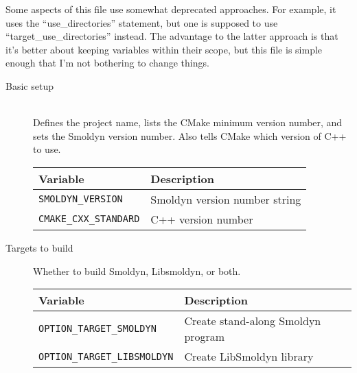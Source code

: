\documentclass {scrbook}
\newcommand {\ttt} {\texttt}
\begin{document}
Some aspects of this file use somewhat deprecated approaches. For example, it uses the ``use\_directories'' statement, but one is supposed to use ``target\_use\_directories'' instead. The advantage to the latter approach is that it's better about keeping variables within their scope, but this file is simple enough that I'm not bothering to change things.

\begin{description}

\item[Basic setup]
\hfill \\
Defines the project name, lists the CMake minimum version number, and sets the Smoldyn version number. Also tells CMake which version of C++ to use.\\
\begin{longtable}[c]{ll}
Variable & Description\\
\hline
\ttt{SMOLDYN\_VERSION} & Smoldyn version number string\\
\ttt{CMAKE\_CXX\_STANDARD} & C++ version number\\
\end{longtable}

\item[Targets to build]
Whether to build Smoldyn, Libsmoldyn, or both.
\begin{longtable}[c]{ll}
Variable & Description\\
\hline
\ttt{OPTION\_TARGET\_SMOLDYN} & Create stand-along Smoldyn program\\
\ttt{OPTION\_TARGET\_LIBSMOLDYN} & Create LibSmoldyn library\\
\end{longtable}


\end{description}
\end{document}
